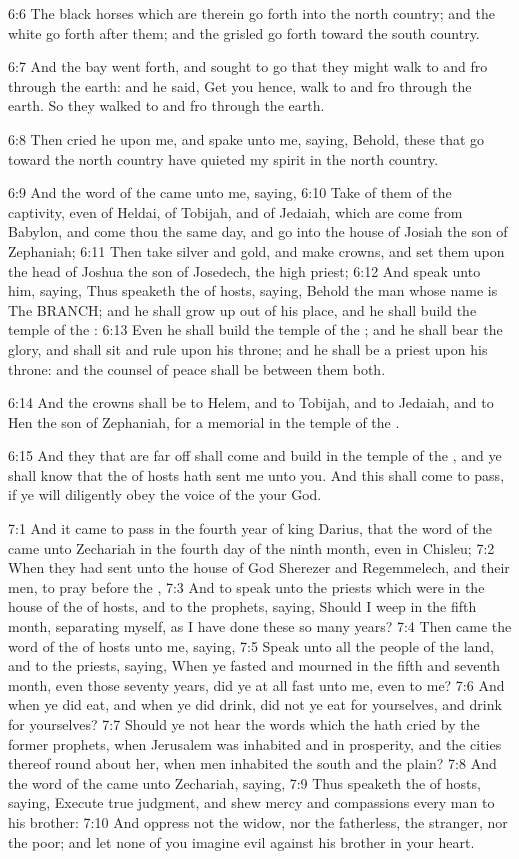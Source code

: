 6:6 The black horses which are therein go forth into the north country; and the white go forth after them; and the grisled go forth toward the south country.

6:7 And the bay went forth, and sought to go that they might walk to and fro through the earth: and he said, Get you hence, walk to and fro through the earth. So they walked to and fro through the earth.

6:8 Then cried he upon me, and spake unto me, saying, Behold, these that go toward the north country have quieted my spirit in the north country.

6:9 And the word of the \LORD came unto me, saying, 6:10 Take of them of the captivity, even of Heldai, of Tobijah, and of Jedaiah, which are come from Babylon, and come thou the same day, and go into the house of Josiah the son of Zephaniah; 6:11 Then take silver and gold, and make crowns, and set them upon the head of Joshua the son of Josedech, the high priest; 6:12 And speak unto him, saying, Thus speaketh the \LORD of hosts, saying, Behold the man whose name is The BRANCH; and he shall grow up out of his place, and he shall build the temple of the \LORD: 6:13 Even he shall build the temple of the \LORD; and he shall bear the glory, and shall sit and rule upon his throne; and he shall be a priest upon his throne: and the counsel of peace shall be between them both.

6:14 And the crowns shall be to Helem, and to Tobijah, and to Jedaiah, and to Hen the son of Zephaniah, for a memorial in the temple of the \LORD.

6:15 And they that are far off shall come and build in the temple of the \LORD, and ye shall know that the \LORD of hosts hath sent me unto you. And this shall come to pass, if ye will diligently obey the voice of the \LORD your God.

7:1 And it came to pass in the fourth year of king Darius, that the word of the \LORD came unto Zechariah in the fourth day of the ninth month, even in Chisleu; 7:2 When they had sent unto the house of God Sherezer and Regemmelech, and their men, to pray before the \LORD, 7:3 And to speak unto the priests which were in the house of the \LORD of hosts, and to the prophets, saying, Should I weep in the fifth month, separating myself, as I have done these so many years?  7:4 Then came the word of the \LORD of hosts unto me, saying, 7:5 Speak unto all the people of the land, and to the priests, saying, When ye fasted and mourned in the fifth and seventh month, even those seventy years, did ye at all fast unto me, even to me?  7:6 And when ye did eat, and when ye did drink, did not ye eat for yourselves, and drink for yourselves?  7:7 Should ye not hear the words which the \LORD hath cried by the former prophets, when Jerusalem was inhabited and in prosperity, and the cities thereof round about her, when men inhabited the south and the plain?  7:8 And the word of the \LORD came unto Zechariah, saying, 7:9 Thus speaketh the \LORD of hosts, saying, Execute true judgment, and shew mercy and compassions every man to his brother: 7:10 And oppress not the widow, nor the fatherless, the stranger, nor the poor; and let none of you imagine evil against his brother in your heart.

